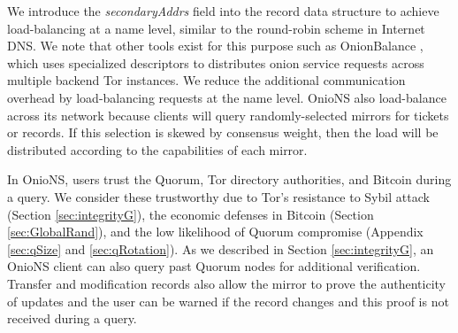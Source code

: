 \documentclass[USenglish,oneside,twocolumn]{article}
\begin{document}
We introduce the \emph{secondaryAddrs} field into the record data structure to achieve load-balancing at a name level, similar to the round-robin scheme in Internet DNS. We note that other tools exist for this purpose such as OnionBalance \cite{OnionBalance}, which uses specialized descriptors to distributes onion service requests across multiple backend Tor instances. We reduce the additional communication overhead by load-balancing requests at the name level. OnioNS also load-balance across its network because clients will query randomly-selected mirrors for tickets or records. If this selection is skewed by consensus weight, then the load will be distributed according to the capabilities of each mirror.

In OnioNS, users trust the Quorum, Tor directory authorities, and Bitcoin during a query. We consider these trustworthy due to Tor's resistance to Sybil attack (Section \ref{sec:integrityG}), the economic defenses in Bitcoin (Section \ref{sec:GlobalRand}), and the low likelihood of Quorum compromise (Appendix \ref{sec:qSize} and \ref{sec:qRotation}). As we described in Section \ref{sec:integrityG}, an OnioNS client can also query past Quorum nodes for additional verification. Transfer and modification records also allow the mirror to prove the authenticity of updates and the user can be warned if the record changes and this proof is not received during a query.
\end{document}
